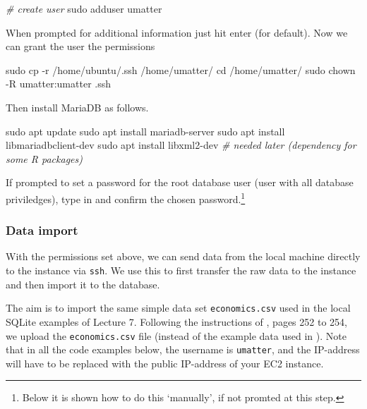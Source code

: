 \documentclass[
  12pt,
]{style/krantz}
\newenvironment{Shaded}{\begin{snugshade}}{\end{snugshade}}
\newcommand{\AttributeTok}[1]{\textcolor[rgb]{0.77,0.63,0.00}{#1}}
\newcommand{\BuiltInTok}[1]{#1}
\newcommand{\CommentTok}[1]{\textcolor[rgb]{0.56,0.35,0.01}{\textit{#1}}}
\newcommand{\FunctionTok}[1]{\textcolor[rgb]{0.00,0.00,0.00}{#1}}
\newcommand{\NormalTok}[1]{#1}
\begin{document}
\begin{Shaded}
\begin{Highlighting}[]
\CommentTok{\# create user}
\FunctionTok{sudo}\NormalTok{ adduser umatter }
\end{Highlighting}
\end{Shaded}

When prompted for additional information just hit enter (for default). Now we can grant the user the permissions

\begin{Shaded}
\begin{Highlighting}[]
\FunctionTok{sudo}\NormalTok{ cp }\AttributeTok{{-}r}\NormalTok{ /home/ubuntu/.ssh /home/umatter/}
\BuiltInTok{cd}\NormalTok{ /home/umatter/}
\FunctionTok{sudo}\NormalTok{ chown }\AttributeTok{{-}R}\NormalTok{ umatter:umatter .ssh}
\end{Highlighting}
\end{Shaded}

Then install MariaDB as follows.

\begin{Shaded}
\begin{Highlighting}[]
\FunctionTok{sudo}\NormalTok{ apt update}
\FunctionTok{sudo}\NormalTok{ apt install mariadb{-}server}
\FunctionTok{sudo}\NormalTok{ apt install libmariadbclient{-}dev}
\FunctionTok{sudo}\NormalTok{ apt install libxml2{-}dev }\CommentTok{\# needed later (dependency for some R packages)}
\end{Highlighting}
\end{Shaded}

If prompted to set a password for the root database user (user with all database priviledges), type in and confirm the chosen password.\footnote{Below it is shown how to do this `manually', if not promted at this step.}

\hypertarget{data-import}{%
\subsubsection{Data import}\label{data-import}}

With the permissions set above, we can send data from the local machine directly to the instance via \texttt{ssh}. We use this to first transfer the raw data to the instance and then import it to the database.

The aim is to import the same simple data set \texttt{economics.csv} used in the local SQLite examples of Lecture 7. Following the instructions of \citet{walkowiak_2016}, pages 252 to 254, we upload the \texttt{economics.csv} file (instead of the example data used in \citet{walkowiak_2016}). Note that in all the code examples below, the username is \texttt{umatter}, and the IP-address will have to be replaced with the public IP-address of your EC2 instance.
\end{document}
